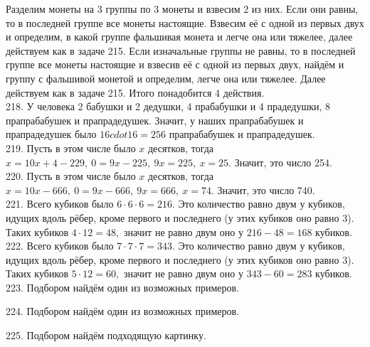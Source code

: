 Разделим монеты на 3 группы по 3 монеты и взвесим 2 из них. Если они равны, то в последней группе все монеты настоящие. Взвесим её с одной из первых двух и определим, в какой группе фальшивая монета и легче она или тяжелее, далее действуем как в задаче 215. Если изначальные группы не равны, то в последней группе все монеты настоящие и взвесив её с одной из первых двух, найдём и группу с фальшивой монетой и определим, легче она или тяжелее. Далее действуем как в задаче 215. Итого понадобится 4 действия.\\
218. У человека 2 бабушки и 2 дедушки, 4 прабабушки и 4 прадедушки, 8 прапрабабушек и прапрадедушек. Значит, у наших прапрабабушек и прапрадедушек было $16cdot16=256$ прапрабабушек и прапрадедушек.\\
219. Пусть в этом числе было $x$ десятков, тогда $x=10x+4-229,\ 0=9x-225,\ 9x=225,\ x=25.$ Значит, это число 254.\\
220. Пусть в этом числе было $x$ десятков, тогда $x=10x-666,\ 0=9x-666,\ 9x=666,\ x=74.$ Значит, это число 740.\\
221. Всего кубиков было $6\cdot6\cdot6=216.$ Это количество равно двум у кубиков, идущих вдоль рёбер, кроме первого и последнего (у этих кубиков оно равно 3).
Таких кубиков $4\cdot12=48,$ значит не равно двум оно у $216-48=168$ кубиков.\\
222. Всего кубиков было $7\cdot7\cdot7=343.$ Это количество равно двум у кубиков, идущих вдоль рёбер, кроме первого и последнего (у этих кубиков оно равно 3).
Таких кубиков $5\cdot12=60,$ значит не равно двум оно у $343-60=283$ кубиков.\\
223. Подбором найдём один из возможных примеров.
\begin{center}
\begin{figure}[ht!]
\end{figure}
\end{center}
224. Подбором найдём один из возможных примеров.
\begin{center}
\begin{figure}[ht!]
\end{figure}
\end{center}
225. Подбором найдём подходящую картинку.
\begin{center}
\begin{figure}[ht!]
\end{figure}
\end{center}
